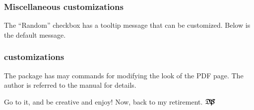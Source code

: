 \documentclass{article}
\def\dps{$\hbox{$\mathfrak D$\kern-.3em\hbox{$\mathfrak P$}%
   \kern-.6em \hbox{$\mathcal S$}}$}
\def\dps{$\mbox{$\mathfrak D$\kern-.3em\mbox{$\mathfrak P$}%
   \kern-.6em \hbox{$\mathcal S$}}$}
\begin{document}
\subsubsection{Miscellaneous customizations}

The ``\textsf{Random}'' checkbox has a tooltip message that can be
customized. Below is the default message.
\bVerb{}%
\begin{dCmd}[commandchars=!()]{\bxSize}
\renewcommand{\toggleRandomizeTU}{Click to toggle between
    random and natural order.}
\end{dCmd}
\bVerb

\subsubsection{\texorpdfstring{\protect{}}{web} customizations}

The  package has may commands for modifying the look of the PDF page. The author is
referred to the {\AEB} manual for details.



\bigskip\noindent
Go to it, and be creative and enjoy! Now, back to my retirement. \dps
\end{document}
